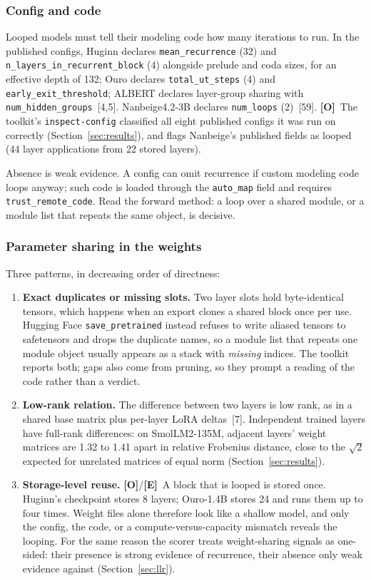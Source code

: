\documentclass[11pt,letterpaper]{article}
\newcommand{\mO}{\textcolor{sensorteal}{\textbf{[O]}}}
\newcommand{\mE}{\textcolor{deepindigo}{\textbf{[E]}}}
\newcommand{\cfg}[1]{\texttt{\small #1}}
\begin{document}
\subsubsection{Config and code}
\label{sec:config}

Looped models must tell their modeling code how many iterations to run. In the published configs, Huginn declares \cfg{mean\_recurrence} (32) and \cfg{n\_layers\_in\_recurrent\_block} (4) alongside prelude and coda sizes, for an effective depth of 132; Ouro declares \cfg{total\_ut\_steps} (4) and \cfg{early\_exit\_threshold}; ALBERT declares layer-group sharing with \cfg{num\_hidden\_groups}~[4,5]. Nanbeige4.2-3B declares \cfg{num\_loops} (2)~[59]. \mO\ The toolkit's \cfg{inspect-config} classified all eight published configs it was run on correctly (Section~\ref{sec:results}), and flags Nanbeige's published fields as looped (44 layer applications from 22 stored layers).

Absence is weak evidence. A config can omit recurrence if custom modeling code loops anyway; such code is loaded through the \cfg{auto\_map} field and requires \cfg{trust\_remote\_code}. Read the forward method: a loop over a shared module, or a module list that repeats the same object, is decisive.

\subsubsection{Parameter sharing in the weights}
\label{sec:sharing}

Three patterns, in decreasing order of directness:
\begin{enumerate}
  \item \textbf{Exact duplicates or missing slots.} Two layer slots hold byte-identical tensors, which happens when an export clones a shared block once per use. Hugging Face \cfg{save\_pretrained} instead refuses to write aliased tensors to safetensors and drops the duplicate names, so a module list that repeats one module object usually appears as a stack with \emph{missing} indices. The toolkit reports both; gaps also come from pruning, so they prompt a reading of the code rather than a verdict.
  \item \textbf{Low-rank relation.} The difference between two layers is low rank, as in a shared base matrix plus per-layer LoRA deltas~[7]. Independent trained layers have full-rank differences: on SmolLM2-135M, adjacent layers' weight matrices are 1.32 to 1.41 apart in relative Frobenius distance, close to the $\sqrt{2}$ expected for unrelated matrices of equal norm (Section~\ref{sec:results}).
  \item \textbf{Storage-level reuse.} \mO/\mE\ A block that is looped is stored once. Huginn's checkpoint stores 8 layers; Ouro-1.4B stores 24 and runs them up to four times. Weight files alone therefore look like a shallow model, and only the config, the code, or a compute-versus-capacity mismatch reveals the looping. For the same reason the scorer treats weight-sharing signals as one-sided: their presence is strong evidence of recurrence, their absence only weak evidence against (Section~\ref{sec:llr}).
\end{enumerate}
\end{document}
